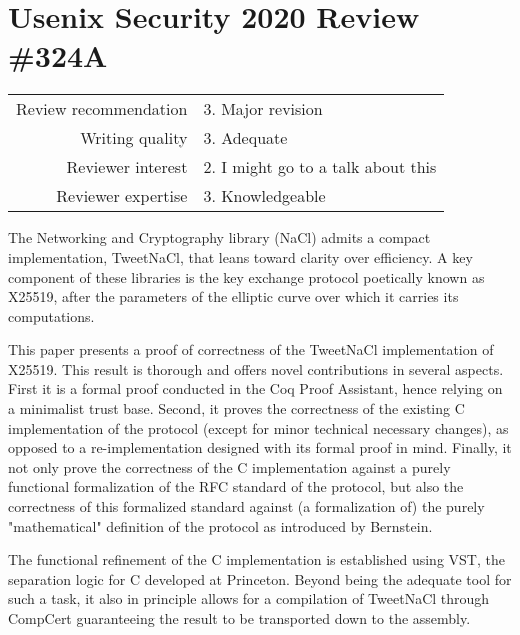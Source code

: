 \newpage
\section{Usenix Security 2020 Review \#324A}

\begin{tabular}{rl}
    \toprule
    Review recommendation & 3. Major revision                  \\
    Writing quality       & 3. Adequate                        \\
    Reviewer interest     & 2. I might go to a talk about this \\
    Reviewer expertise    & 3. Knowledgeable                   \\
    \bottomrule
\end{tabular}




\begin{center}
\end{center}

The Networking and Cryptography library (NaCl) admits a compact implementation,
TweetNaCl, that leans toward clarity over efficiency.
A key component of these libraries is the key exchange protocol poetically known
as X25519, after the parameters of the elliptic curve over which it carries its
computations.

This paper presents a proof of correctness of the TweetNaCl implementation of X25519.
This result is thorough and offers novel contributions in several aspects.
First it is a formal proof conducted in the Coq Proof Assistant, hence relying on a
minimalist trust base.
Second, it proves the correctness of the existing C implementation of the protocol
(except for minor technical necessary changes), as opposed to a re-implementation
designed with its formal proof in mind.
Finally, it not only prove the correctness of the C implementation against a
purely functional formalization of the RFC standard of the protocol, but also
the correctness of this formalized standard against (a formalization of) the purely
"mathematical" definition of the protocol as introduced by Bernstein.

The functional refinement of the C implementation is established using VST,
the separation logic for C developed at Princeton. Beyond being the adequate
tool for such a task, it also in principle allows for a compilation of TweetNaCl
through CompCert guaranteeing the result to be transported down to the assembly.

